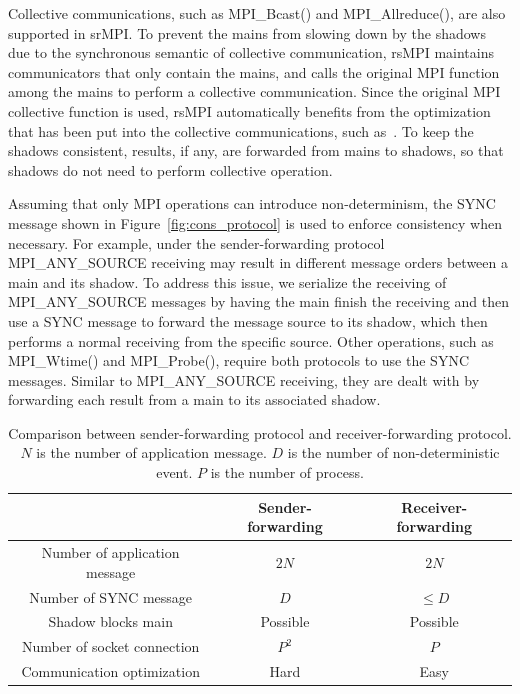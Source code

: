 Collective communications, such as MPI\_Bcast() and MPI\_Allreduce(), are also supported in srMPI. To prevent the mains from slowing down by the shadows due to the synchronous semantic of collective communication, rsMPI maintains communicators that only contain the mains, and calls the original MPI function among the mains to perform a collective communication. Since the original MPI collective function is used, rsMPI automatically benefits from the optimization that has been put into the collective communications, such as~\cite{thakur2005optimization}. To keep the shadows consistent, results, if any, are forwarded from mains to shadows, so that shadows do not need to perform collective operation.

Assuming that only MPI operations can introduce non-determinism, the SYNC message shown in Figure~\ref{fig:cons_protocol} is used to enforce consistency when necessary. For example, under the sender-forwarding protocol MPI\_ANY\_SOURCE receiving may result in different message orders between a main and its shadow. To address this issue, we serialize the receiving of MPI\_ANY\_SOURCE messages by having the main finish the receiving and then use a SYNC message to forward the message source to its shadow, which then performs a normal receiving from the specific source. Other operations, such as MPI\_Wtime() and MPI\_Probe(), require both protocols to use the SYNC messages. Similar to MPI\_ANY\_SOURCE receiving, they are dealt with by forwarding each result from a main to its associated shadow.

\begin{table}[!h]
\caption{Comparison between sender-forwarding protocol and receiver-forwarding protocol. $N$ is the number of application message. $D$ is the number of non-deterministic event. $P$ is the number of process.}
\centering
\begin{tabular}{|c | c | c |}
\hline 
 & Sender-forwarding  & Receiver-forwarding  \\
\hline \hline 
Number of application message  & $2N$ & $2N$ \\
\hline
Number of SYNC message & $D$ &  $\le D$ \\
\hline
Shadow blocks main & Possible & Possible \\
\hline
Number of socket connection & $P^2$ & $P$ \\
\hline
Communication optimization & Hard & Easy \\
\hline
\end{tabular}
\label{tbl:cons_protocol_comp}
\end{table}

